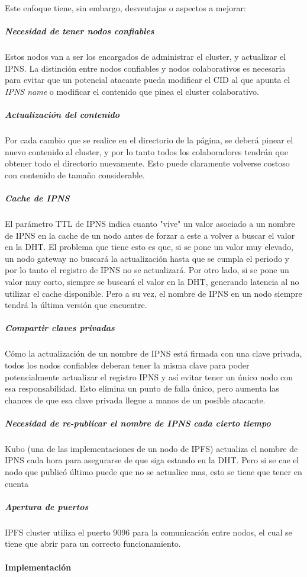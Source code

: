 Este enfoque tiene, sin embargo, desventajas o aspectos a mejorar:

\subparagraph{Necesidad de tener nodos confiables} Estos nodos van a ser los encargados de administrar el cluster, y actualizar el IPNS. La distinción entre nodos confiables y nodos colaborativos es necesaria para evitar que un potencial atacante pueda modificar el CID al que apunta el \textit{IPNS name} o modificar el contenido que pinea el cluster colaborativo.
 
\subparagraph{Actualización del contenido} Por cada cambio que se realice en el directorio de la página, se deberá pinear el nuevo contenido al cluster, y por lo tanto todos los colaboradores tendrán que obtener todo el directorio nuevamente. Esto puede claramente volverse costoso con contenido de tamaño considerable.
    
\subparagraph{Cache de IPNS} El parámetro TTL de IPNS indica cuanto "vive" un valor asociado a un nombre de IPNS en la cache de un nodo antes de forzar a este a volver a buscar el valor en la DHT. El problema que tiene esto es que, si se pone un valor muy elevado, un nodo gateway no buscará la actualización hasta que se cumpla el periodo y por lo tanto el registro de IPNS no se actualizará. Por otro lado, si se pone un valor muy corto, siempre se buscará el valor en la DHT, generando latencia al no utilizar el cache disponible. Pero a su vez, el nombre de IPNS en un nodo siempre tendrá la última versión que encuentre.

\subparagraph{Compartir claves privadas} Cómo la actualización de un nombre de IPNS está firmada con una clave privada, todos los nodos confiables deberan tener la misma clave para poder potencialmente actualizar el registro IPNS y así evitar tener un único nodo con esa responsabilidad. Esto elimina un punto de falla único, pero aumenta las chances de que esa clave privada llegue a manos de un posible atacante.

\subparagraph{Necesidad de re-publicar el nombre de IPNS cada cierto tiempo} Kubo (una de las implementaciones de un nodo de IPFS) actualiza el nombre de IPNS cada hora para asegurarse de que siga estando en la DHT. Pero si se cae el nodo que publicó último puede que no se actualice mas, esto se tiene que tener en cuenta

\subparagraph{Apertura de puertos} IPFS cluster utiliza el puerto 9096 para la comunicación entre nodos, el cual se tiene que abrir para un correcto funcionamiento.

\paragraph{Implementación}

